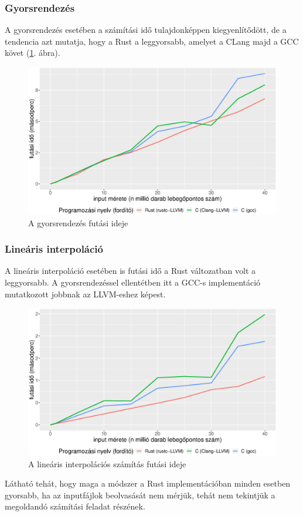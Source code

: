 \subsubsection{Gyorsrendezés}

A gyorsrendezés esetében a számítási idő tulajdonképpen kiegyenlítődött, de a tendencia azt mutatja, hogy a Rust a leggyorsabb, amelyet a CLang majd a GCC követ (\ref{fig:quicksort_fixed}. ábra).

\begin{figure}[h!]
\centering
\includegraphics[width=15.5cm]{kepek/quicksort_run_without_read.eps}
\caption{A gyorsrendezés futási ideje}
\label{fig:quicksort_fixed}
\end{figure}

\subsubsection{Lineáris interpoláció}

A lineáris interpoláció esetében is futási idő a Rust változatban volt a leggyorsabb. A gyorsrendezéssel ellentétben itt a GCC-s implementáció mutatkozott jobbnak az LLVM-eshez képest.

\begin{figure}[h!]
\centering
\includegraphics[width=15.5cm]{kepek/linear_interpolation_run_without_read.eps}
\caption{A lineáris interpolációs számítás futási ideje}
\label{fig:interpolation_fixed}
\end{figure}

Látható tehát, hogy maga a módszer a Rust implementációban minden esetben gyorsabb, ha az inputfájlok beolvasását nem mérjük, tehát nem tekintjük a megoldandó számítási feladat részének.
